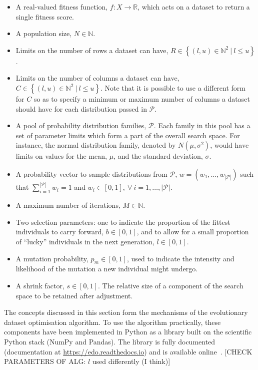 \begin{itemize}
    \item A real-valued fitness function, \(f: X \to \mathbb{R}\), which acts on
        a dataset to return a single fitness score.
    \item A population size, \(N \in \mathbb{N}\).
    \item Limits on the number of rows a dataset can have,
        \(R \in \left\{(l, u) \in \mathbb{N}^2~|~l \leq u\right\}\).
    \item Limits on the number of columns a dataset can have,
        \(C \in \left\{(l, u) \in \mathbb{N}^2~|~l \leq u\right\}\). Note that
        it is possible to use a different form for \(C\) so as to specify a
        minimum or maximum number of columns a dataset should have for each
        distribution passed in \(\mathcal{P}\).
    \item A pool of probability distribution families, \(\mathcal{P}\). Each
        family in this pool has a set of parameter limits which form a part of
        the overall search space. For instance, the normal distribution family,
        denoted by \(N(\mu, \sigma^2)\), would have limits on values
        for the mean, \(\mu\), and the standard deviation, \(\sigma\).
    \item A probability vector to sample distributions from \(\mathcal{P}\),
        \(w = \left(w_1, \ldots, w_{|\mathcal{P}|}\right)\) such that
        \(\sum_{i=1}^{|\mathcal{P}|} w_i = 1\) and
        \(w_i \in [0, 1], \ \forall~i = 1, \ldots, |\mathcal{P}|\).
    \item A maximum number of iterations, \(M \in \mathbb{N}\).
    \item Two selection parameters: one to indicate the proportion of the
        fittest individuals to carry forward, \(b \in [0, 1]\), and to allow for
        a small proportion of ``lucky'' individuals in the next generation,
        \(l \in [0, 1]\).
    \item A mutation probability, \(p_m \in [0, 1]\), used to indicate the
        intensity and likelihood of the mutation a new individual might undergo.
    \item A shrink factor, \(s \in [0, 1]\). The relative size of a component of
        the search space to be retained after adjustment.
\end{itemize}

The concepts discussed in this section form the mechanisms of the evolutionary
dataset optimisation algorithm. To use the algorithm practically, these
components have been implemented in Python as a library built on the scientific
Python stack (NumPy and Pandas). The library is fully documented (documentation
at \url{https://edo.readthedocs.io}) and is available online~\cite{edo-project}.
[CHECK PARAMETERS OF ALG: $l$ used differently (I think)]
\label{alg:edo}


